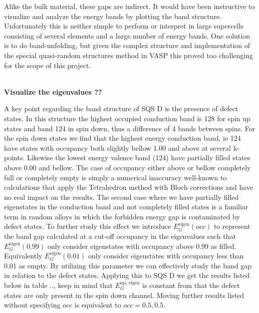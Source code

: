 Alike the bulk material, these gaps are indirect. It would have been instructive to visualize and analyze the energy bands by plotting the band structure. Unfortunately this is neither simple to perform or interpret in large supercells consisting of several elements and a large number of energy bands. One solution is to do band-unfolding, but given the complex structure and implementation of the special quasi-random structures method in VASP this proved too challenging for the scope of this project. 

 
\textbf{ \\ Visualize the eigenvalues ??}

A key point regarding the band structure of SQS D is the presence of defect states. In this structure the highest occupied conduction band is 128 for spin up states and band 124 in spin down, thus a difference of 4 bands between spins. For the spin down states we find that the highest energy conduction band, ie 124 have states with occupancy both slightly bellow 1.00 and above at several k-points. Likewise the lowest energy valence band (124) have partially filled states above 0.00 and bellow. The case of occupancy either above or bellow completely full or completely empty is simply a numerical inaccuracy well-known to calculations that apply the Tetrahedron method with Bloch corrections and have no real impact on the results. The second case where we have partially filled eigenstates in the conduction band and not completely filled states is a familiar term in random alloys \cite{PhysRevLett.104.236403} in which the forbidden energy gap is contaminated by defect states. To further study this effect we introduce $E_G ^\text{eigen}(occ)$ to represent the band gap calculated at a cut-off occupancy in the eigenvalues such that $E_G ^\text{eigen}(0.99)$ only consider eigenstates with occupancy above 0.99 as filled. Equivalently $E_G ^\text{eigen}(0.01)$ only consider eigenstates with occupancy less than 0.01 as empty. By utilizing this parameter we can effectively study the band gap in relation to the defect states. Applying this to SQS D we get the results listed below in table .., keep in mind that $E_G ^\text{up, eigen}$ is constant from that the defect states are only present in the spin down channel. Moving further results listed without specifying $occ$ is equivalent to $occ = 0.5, 0.5$.

